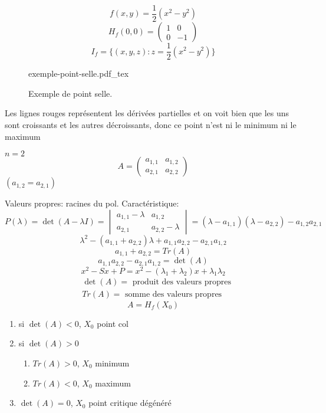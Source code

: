 \documentclass[a4paper]{report}
\theoremstyle{definition}
\newcommand{\incfig}[1]{%
    \def\svgwidth{\columnwidth}
    {#1.pdf_tex}
}
\begin{document}
\begin{eg}
   \[
   f(x, y) = \frac{1}{2}(x^2 - y^2)
   \]  
   \[
       H_f(0, 0) = \begin{pmatrix} 1 & 0\\ 0 & -1 \end{pmatrix} 
   \] 
   \[
       I_f = \{(x, y, z): z = \frac{1}{2}(x^2 - y^2)\}
   \] 
\begin{figure}[H]
    \centering
    \incfig{exemple-point-selle}
    \caption{Exemple de point selle.}
    \label{fig:exemple-point-selle}
\end{figure}
Les lignes rouges représentent les dérivées partielles et on voit bien que les uns sont croissants et les autres décroissants, donc ce point n'est ni le minimum ni le maximum
\end{eg}

\begin{eg}
$n = 2$
 \[
A = \begin{pmatrix} 
    a_{1,1} & a_{1, 2}\\
    a_{2, 1} & a_{2, 2}
\end{pmatrix} 
\] 
$(a_{1,2} = a_{2, 1})$
\par
Valeurs propres: racines du pol. Caractéristique:  
\[
    P(\lambda) = \det(A - \lambda I) = \begin{vmatrix} a_{1,1} - \lambda & a_{1, 2} \\ a_{2, 1} & a_{2,2} - \lambda \end{vmatrix} = (\lambda - a_{1,1})(\lambda - a_{2,2}) -  a_{1,2}a_{2,1}
\] 
\[
    \lambda^2 - (a_{1,1} + a_{2,2})\lambda + a_{1,1}a_{2,2} - a_{2,1}a_{1,2}
\] 
\[
    a_{1,1} + a_{2,2} = Tr(A)
\] 
\[
    a_{1,1}a_{2,2} - a_{2,1}a_{1,2} = \det(A)
\] 
\[
    x^2 - Sx + P = x^2 - (\lambda_1 + \lambda_2)x + \lambda_1\lambda_2
\] 
\begin{align*}
    &\det(A) = \text{ produit des valeurs propres}\\
    &Tr(A) = \text{ somme des valeurs propres}
\end{align*}
\[
A = H_f(X_0)
\] 
\begin{enumerate}
    \item si $\det(A) < 0$,  $X_0$ point col
    \item si $\det(A) > 0$
         \begin{enumerate}
            \item $Tr(A) > 0$, $X_0$ minimum
            \item  $Tr(A) < 0$, $X_0$ maximum
        \end{enumerate}
    \item $\det(A) = 0$,  $X_0$ point critique dégénéré
\end{enumerate}
\end{eg}
\end{document}

